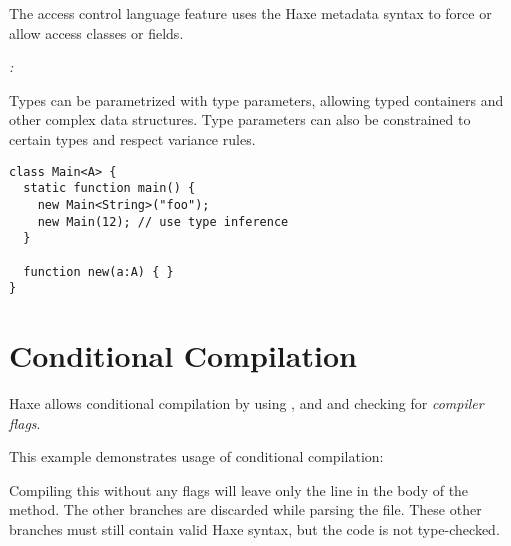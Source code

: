 The access control language feature uses the Haxe metadata syntax to force or allow access classes or fields.

\emph{:}

Types can be parametrized with type parameters, allowing typed containers and other complex data structures. Type parameters can also be constrained to certain types and respect variance rules.

\begin{lstlisting}
class Main<A> {
  static function main() {
    new Main<String>("foo");
    new Main(12); // use type inference
  }

  function new(a:A) { }
}
\end{lstlisting}

%
%

\section{Conditional Compilation}
\label{lf-condition-compilation}

Haxe allows conditional compilation by using ,  and  and checking for \emph{compiler flags}.


This example demonstrates usage of conditional compilation:


Compiling this without any flags will leave only the  line in the body of the  method. The other branches are discarded while parsing the file. These other branches must still contain valid Haxe syntax, but the code is not type-checked.

